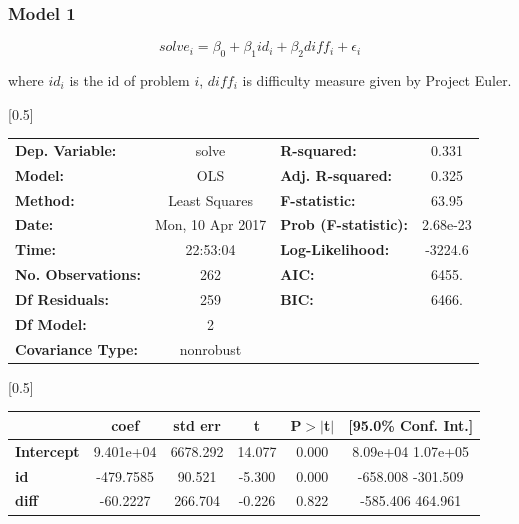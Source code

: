 \documentclass{beamer}
\begin{document}
\begin{frame}

\frametitle{Model 1}

$$
solve_i = \beta_0 + \beta_1 id_i + \beta_2 diff_i + \epsilon_i
$$

where $id_i$ is the id of problem $i$, $diff_i$ is difficulty measure given by Project Euler.

\begin{center}
\scalebox{0.5}[0.5]{
\begin{tabular}{lclc}
\toprule
\textbf{Dep. Variable:}    &      solve       & \textbf{  R-squared:         } &    0.331  \\
\textbf{Model:}            &       OLS        & \textbf{  Adj. R-squared:    } &    0.325  \\
\textbf{Method:}           &  Least Squares   & \textbf{  F-statistic:       } &    63.95  \\
\textbf{Date:}             & Mon, 10 Apr 2017 & \textbf{  Prob (F-statistic):} & 2.68e-23  \\
\textbf{Time:}             &     22:53:04     & \textbf{  Log-Likelihood:    } &  -3224.6  \\
\textbf{No. Observations:} &         262      & \textbf{  AIC:               } &    6455.  \\
\textbf{Df Residuals:}     &         259      & \textbf{  BIC:               } &    6466.  \\
\textbf{Df Model:}         &           2      & \textbf{                     } &           \\
\textbf{Covariance Type:}  &    nonrobust     & \textbf{                     } &           \\
\bottomrule
\end{tabular}
}
\scalebox{0.5}[0.5]{
\begin{tabular}{lccccc}
\toprule
                   & \textbf{coef} & \textbf{std err} & \textbf{t} & \textbf{P$>$$|$t$|$} & \textbf{[95.0\% Conf. Int.]}  \\
\midrule
\textbf{Intercept} &    9.401e+04  &     6678.292     &    14.077  &         0.000        &      8.09e+04  1.07e+05       \\
\textbf{id}        &    -479.7585  &       90.521     &    -5.300  &         0.000        &      -658.008  -301.509       \\
\textbf{diff}      &     -60.2227  &      266.704     &    -0.226  &         0.822        &      -585.406   464.961       \\

\end{tabular}}
\end{center}
\end{frame}
\end{document}
